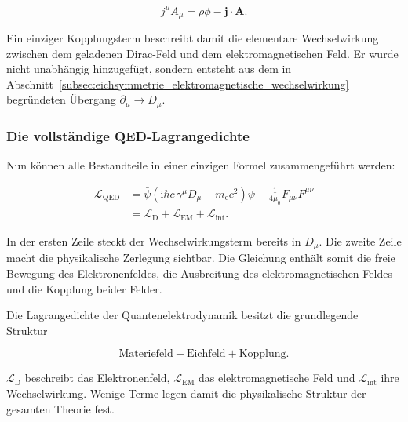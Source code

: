 \begin{equation*}
	j^\mu A_\mu
	=
	\rho\phi
	-
	\mathbf j\cdot\mathbf A.
\end{equation*}

Ein einziger Kopplungsterm beschreibt damit die elementare
Wechselwirkung zwischen dem geladenen Dirac-Feld und dem
elektromagnetischen Feld. Er wurde nicht unabhängig hinzugefügt,
sondern entsteht aus dem in
Abschnitt~\ref{subsec:eichsymmetrie_elektromagnetische_wechselwirkung}
begründeten Übergang
\(\partial_\mu\longrightarrow D_\mu\).

\subsubsection*{Die vollständige QED-Lagrangedichte}

Nun können alle Bestandteile in einer einzigen Formel zusammengeführt
werden:

\begin{equation}
	\begin{aligned}
	\mathcal L_{\mathrm{QED}}
	&=
	\bar{\psi}
	\left(
	\mathrm{i}\hbar c\,\gamma^\mu D_\mu
	-
	m_{\mathrm e}c^2
	\right)
	\psi
	-
	\frac{1}{4\mu_0}F_{\mu\nu}F^{\mu\nu}
	\\[4pt]
	&=
	\mathcal L_{\mathrm D}
	+
	\mathcal L_{\mathrm{EM}}
	+
	\mathcal L_{\mathrm{int}}.
	\end{aligned}
	\label{eq:lagrangedichte_qed}
\end{equation}

In der ersten Zeile steckt der Wechselwirkungsterm bereits in
\(D_\mu\). Die zweite Zeile macht die physikalische Zerlegung sichtbar.
Die Gleichung enthält somit die freie Bewegung des Elektronenfeldes,
die Ausbreitung des elektromagnetischen Feldes und die Kopplung beider
Felder.

\begin{PhysicsBox}
	\label{box:qed_drei_terme}

	Die Lagrangedichte der Quantenelektrodynamik besitzt die grundlegende
	Struktur

	\begin{equation*}
		\boxed{
		\text{Materiefeld}
		+
		\text{Eichfeld}
		+
		\text{Kopplung}
		}.
	\end{equation*}

	\(\mathcal L_{\mathrm D}\) beschreibt das Elektronenfeld,
	\(\mathcal L_{\mathrm{EM}}\) das elektromagnetische Feld und
	\(\mathcal L_{\mathrm{int}}\) ihre Wechselwirkung. Wenige Terme legen
	damit die physikalische Struktur der gesamten Theorie fest.
\end{PhysicsBox}

